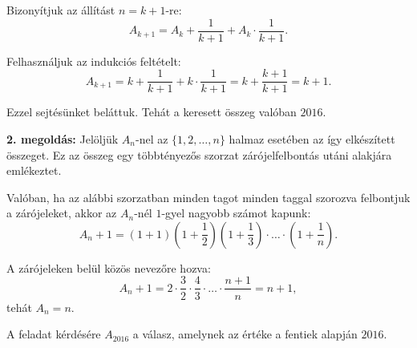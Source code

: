 \documentclass[a4paper,10pt]{article}
\begin{document}
\smallskip

\noindent Bizonyítjuk az állítást $n=k+1$-re:
\[A_{k+1}=A_k +\frac 1 {k+1}+A_k \cdot \frac 1 {k+1}.\]

\noindent Felhasználjuk az indukciós feltételt:
\[A_{k+1}=k +\frac 1 {k+1}+k \cdot \frac 1 {k+1}=k+\frac {k+1}{k+1}=k+1.\]

\noindent Ezzel sejtésünket  beláttuk. Tehát a keresett összeg valóban $2016$.

\medskip 

{\bf 2. megoldás: } Jelöljük $A_n$-nel az $\{1, 2, \ldots , n\}$ halmaz esetében az így elkészített összeget. Ez az összeg egy többtényezős szorzat zárójelfelbontás utáni alakjára emlékeztet.

\smallskip

\noindent Valóban, ha az alábbi szorzatban minden tagot minden taggal szorozva felbontjuk a zárójeleket, akkor az $A_n$-nél $1$-gyel nagyobb számot kapunk:
\[A_n +1=\left(1+1\right) \left(1+\frac1 2\right) \left(1+\frac 1 3\right) \cdot \ldots \cdot \left(1+\frac 1 n\right).\]

\noindent A zárójeleken belül közös nevezőre hozva:
\[A_n+1=2\cdot \frac 3 2 \cdot \frac 4 3\cdot \ldots \cdot \frac {n+1} n=n+1,\]
tehát $A_n=n$. 

\smallskip

\noindent A feladat kérdésére $A_{2016}$ a válasz, amelynek az értéke a fentiek alapján $2016$.
\end{document}
